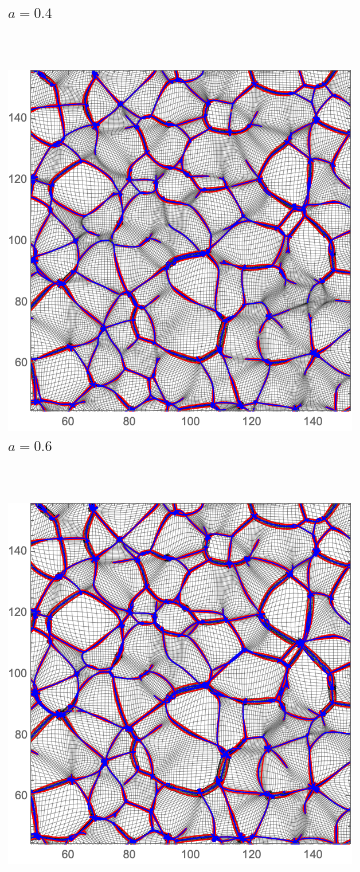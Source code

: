 \documentclass[a4paper, 11pt]{article}
\begin{document}
\begin{figure}
\begin{subfigure}[b]{0.49\textwidth}
\caption{$a=0.4$}
\end{subfigure}\\[0.5cm]
\begin{subfigure}[b]{0.49\textwidth}
\includegraphics[width=\textwidth]{Evolution_060}
\caption{$a=0.6$}
\end{subfigure}~
\begin{subfigure}[b]{0.49\textwidth}
\includegraphics[width=\textwidth]{Evolution_080}

\end{subfigure}
\end{figure}
\end{document}
